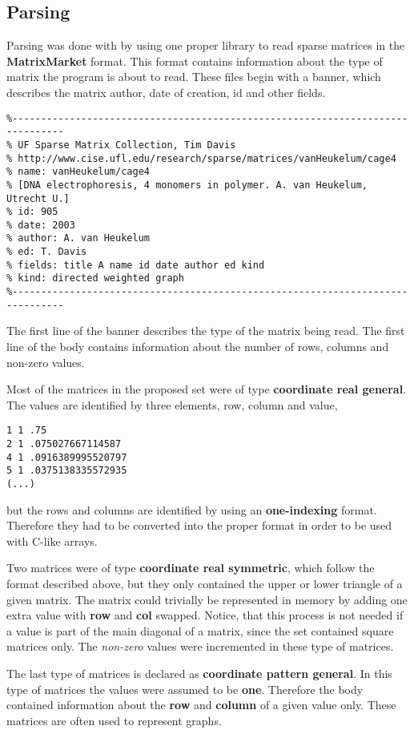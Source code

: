 \documentclass[12pt]{article}
\begin{document}
\subsection*{Parsing}

\par Parsing was done with by using one proper library to read sparse matrices in the \textbf{MatrixMarket} format. This format contains information about the type of matrix the program is about to read. These files begin with a banner, which describes the matrix author, date of creation, id and other fields.

\begin{lstlisting}[style=banner]
%%MatrixMarket matrix coordinate real general
%-------------------------------------------------------------------------------
% UF Sparse Matrix Collection, Tim Davis
% http://www.cise.ufl.edu/research/sparse/matrices/vanHeukelum/cage4
% name: vanHeukelum/cage4
% [DNA electrophoresis, 4 monomers in polymer. A. van Heukelum, Utrecht U.]
% id: 905
% date: 2003
% author: A. van Heukelum
% ed: T. Davis
% fields: title A name id date author ed kind
% kind: directed weighted graph
%-------------------------------------------------------------------------------
\end{lstlisting}

\par The first line of the banner describes the type of the matrix being read. The first line of the body contains information about the number of rows, columns and non-zero values. 
\par Most of the matrices in the proposed set were of type \textbf{coordinate real general}. The values are identified by three elements, row, column and value,

\begin{lstlisting}[style=banner]
1 1 .75
2 1 .075027667114587
4 1 .0916389995520797
5 1 .0375138335572935
(...)
\end{lstlisting}

but the rows and columns are identified by using an \textbf{one-indexing} format. Therefore they had to be converted into the proper format in order to be used with C-like arrays. 
\par Two matrices were of type \textbf{coordinate real symmetric}, which follow the format described above, but they only contained the upper or lower triangle of a given matrix. The matrix could trivially be represented in memory by adding one extra value with \textbf{row} and \textbf{col} swapped. Notice, that this process is not needed if a value is part of the main diagonal of a matrix, since the set contained square matrices only. The \textit{non-zero} values were incremented in these type of matrices.
\par The last type of matrices is declared as \textbf{coordinate pattern general}. In this type of matrices the values were assumed to be \textbf{one}. Therefore the body contained information about the \textbf{row} and \textbf{column} of a given value only. These matrices are often used to represent graphs.
\end{document}
